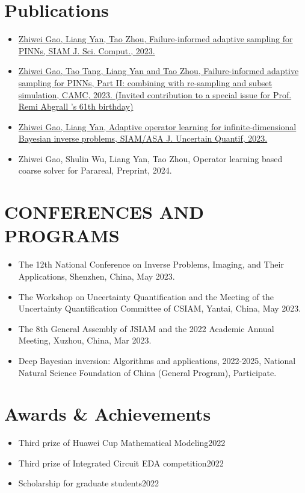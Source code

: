 \documentclass[letterpaper,11pt]{article}
\newcommand{\resumeItem}[1]{
  \item\small{
    {#1 \vspace{-2pt}}
  }
}
\newcommand{\resumeItemListStart}{\begin{itemize}}
\newcommand{\resumeItemListEnd}{\end{itemize}\vspace{-5pt}}
\begin{document}
\section{Publications}
    \vspace{3pt}
          \resumeItemListStart
            \resumeItem{\href{https://epubs.siam.org/doi/10.1137/22M1527763}{Zhiwei Gao, Liang Yan, Tao Zhou, Failure-informed adaptive sampling for PINNs, SIAM J. Sci. Comput., 2023.}}
            \resumeItem{ \href{https://link.springer.com/article/10.1007/s42967-023-00312-7}{Zhiwei Gao, Tao Tang, Liang Yan and Tao Zhou,  Failure-informed adaptive sampling for PINNs, Part II: combining with re-sampling and subset simulation, CAMC, 2023.  (Invited contribution to a special issue for Prof. Remi Abgrall 's 61th birthday)}}
            \resumeItem{\href{https://arxiv.org/abs/2310.17844}{Zhiwei Gao, Liang Yan, Adaptive operator learning for infinite-dimensional Bayesian inverse problems, SIAM/ASA J. Uncertain Quantif, 2023.}}
            \resumeItem{Zhiwei Gao, Shulin Wu, Liang Yan, Tao Zhou, Operator learning based coarse solver for Parareal, Preprint, 2024.}
          \resumeItemListEnd
      
\section{CONFERENCES AND PROGRAMS}
\vspace{3pt}
\resumeItemListStart
\resumeItem{The 12th National Conference on Inverse Problems, Imaging, and Their Applications, Shenzhen, China, May 2023.}
\resumeItem{The Workshop on Uncertainty Quantification and the Meeting of the Uncertainty Quantification Committee of CSIAM, Yantai, China, May 2023.}
\resumeItem{The 8th General Assembly of JSIAM and the 2022 Academic Annual Meeting, Xuzhou, China, Mar 2023.}
\resumeItem{Deep Bayesian inversion: Algorithms and applications, 2022-2025, National Natural Science Foundation of China (General Program), Participate.}
\resumeItemListEnd 

\section{Awards \& Achievements}
  \vspace{2pt}
  \begin{itemize}
    \item Third prize of Huawei Cup Mathematical Modeling\hfill 2022
    \item Third prize of Integrated Circuit EDA competition\hfill 2022
    \item Scholarship for graduate students\hfill 2022
  \end{itemize}
    
\end{document}
